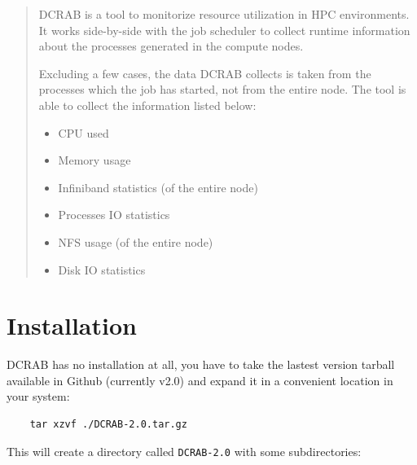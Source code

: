 \documentclass[10pt,a4paper]{report}
\begin{document}

\begin{abstract}

DCRAB is a tool to monitorize resource utilization in HPC environments. It works side-by-side with the job scheduler to collect runtime information about the processes generated in the compute nodes.

Excluding a few cases, the data DCRAB collects is taken from the processes which the job has started, not from the entire node. The tool is able to collect the information listed below:

\begin{itemize}
	\item CPU used
	\item Memory usage
	\item Infiniband statistics (of the entire node)
	\item Processes IO statistics
	\item NFS usage (of the entire node)
	\item Disk IO statistics
\end{itemize}

\end{abstract}


\tableofcontents


\chapter{Installation}

DCRAB has no installation at all, you have to take the lastest version tarball available in Github (currently v2.0) and expand it in a convenient location in your system:

\begin{verbatim}
    tar xzvf ./DCRAB-2.0.tar.gz
\end{verbatim}

This will create a directory called \verb+DCRAB-2.0+ with some subdirectories:
\end{document}
